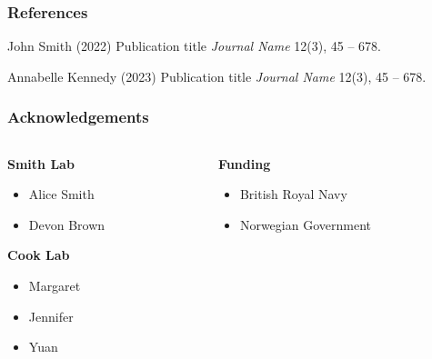 \documentclass[
11pt, %
]{beamer}
\begin{document}
	\begin{frame} %
		\frametitle{References}
		
		\begin{thebibliography}{99} %
			\footnotesize %
			
			John Smith (2022)
			\newblock Publication title
			\newblock \emph{Journal Name} 12(3), 45 -- 678.
			
			Annabelle Kennedy (2023)
			\newblock Publication title
			\newblock \emph{Journal Name} 12(3), 45 -- 678.
		\end{thebibliography}
	\end{frame}
	
	
	\begin{frame}
		\frametitle{Acknowledgements}
		
		\begin{columns}[t] %
			\begin{column}{0.45\textwidth} %
				\textbf{Smith Lab}
				\begin{itemize}
					\item Alice Smith
					\item Devon Brown
				\end{itemize}
				\textbf{Cook Lab}
				\begin{itemize}
					\item Margaret
					\item Jennifer
					\item Yuan
				\end{itemize}
			\end{column}		
			\begin{column}{0.5\textwidth} %
				\textbf{Funding}
				\begin{itemize}
					\item British Royal Navy
					\item Norwegian Government
				\end{itemize}
			\end{column}
		\end{columns}
	\end{frame}
	
\end{document}
